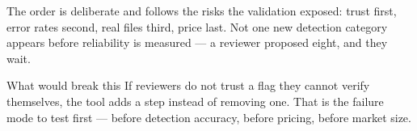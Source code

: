 \documentclass[10pt,a4paper]{article}
\begin{document}
\vspace{4pt}
{\footnotesize\color{muted}The order is deliberate and follows the risks the
validation exposed: trust first, error rates second, real files third, price
last. Not one new detection category appears before reliability is measured ---
a reviewer proposed eight, and they wait.}

\vspace{6pt}
\begin{badbox}{What would break this}
If reviewers do not trust a flag they cannot verify themselves, the tool adds a
step instead of removing one. That is the failure mode to test first --- before
detection accuracy, before pricing, before market size.
\end{badbox}
\end{document}
